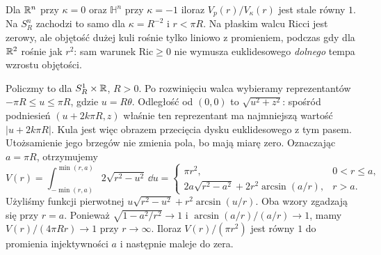 \begin{przyklad}
Dla $\mathbb{R}^n$ przy $\kappa=0$ oraz
$\mathbb H^n$ przy $\kappa=-1$ iloraz
$V_p(r)/V_\kappa(r)$ jest stale równy $1$.
Na $S_R^n$ zachodzi to samo dla
$\kappa=R^{-2}$ i $r<\pi R$.
Na płaskim walcu Ricci jest zerowy, ale
objętość dużej kuli rośnie tylko liniowo
z promieniem, podczas gdy dla $\mathbb{R}^2$
rośnie jak $r^2$: sam warunek $\mathrm{Ric}\geq0$
nie wymusza euklidesowego \emph{dolnego}
tempa wzrostu objętości.

Policzmy to dla $S_R^1\times\mathbb{R}$, $R>0$.
Po rozwinięciu walca wybieramy reprezentantów
$-\pi R\leq u\leq\pi R$, gdzie $u=R\theta$.
Odległość od $(0,0)$ to $\sqrt{u^2+z^2}$:
spośród podniesień $(u+2k\pi R,z)$ właśnie ten
reprezentant ma najmniejszą wartość $|u+2k\pi R|$.
Kula jest więc obrazem przecięcia dysku euklidesowego
z tym pasem. Utożsamienie jego brzegów nie zmienia pola,
bo mają miarę zero. Oznaczając $a=\pi R$, otrzymujemy
\[
 V(r)=\int_{-\min(r,a)}^{\min(r,a)}2\sqrt{r^2-u^2}\,\dd u
 =\begin{cases}
   \pi r^2,&0<r\leq a,\\
   2a\sqrt{r^2-a^2}+2r^2\arcsin(a/r),&r>a.
  \end{cases}
\]
Użyliśmy funkcji pierwotnej
$u\sqrt{r^2-u^2}+r^2\arcsin(u/r)$.
Oba wzory zgadzają się przy $r=a$.
Ponieważ $\sqrt{1-a^2/r^2}\to1$ i
$\arcsin(a/r)/(a/r)\to1$, mamy
$V(r)/(4\pi Rr)\to1$ przy $r\to\infty$.
Iloraz $V(r)/(\pi r^2)$ jest równy $1$ do promienia
injektywności $a$ i następnie maleje do zera.
\end{przyklad}

